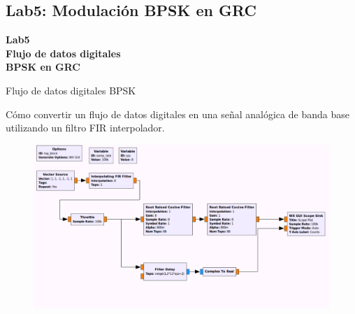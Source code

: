 \subsection{Lab5: Modulación BPSK en GRC}

\begin{frame}{}


\bfseries{\textrm{\LARGE Lab5\\ \Large Flujo de datos digitales\\BPSK en GRC}}
\raggedright
\end{frame}

\begin{frame}{Flujo de datos digitales BPSK}


\justifying
Cómo convertir un flujo de datos digitales en una señal analógica de banda base utilizando un filtro FIR interpolador.\cite{Oregon Institute of Technology}
\\
\begin{figure}
\includegraphics[width=.9\textwidth]{parte1/lab5/pdf/lab5_1.pdf}
\end{figure}
\end{frame}

